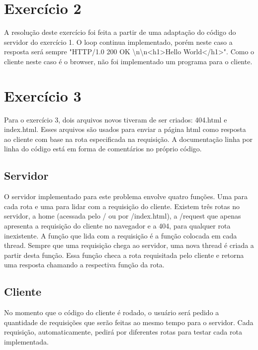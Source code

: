 \documentclass[a4paper,12pt]{article}
\begin{document}
\section{Exercício 2}
A resolução deste exercício foi feita a partir de uma adaptação do código do servidor do exercício 1. O loop continua implementado, porém neste caso a resposta será sempre "HTTP/1.0 200 OK \textbackslash n\textbackslash n<h1>Hello World</h1>". Como o cliente neste caso é o browser, não foi implementado um programa para o cliente.
\section{Exercício 3}
Para o exercício 3, dois arquivos novos tiveram de ser criados: 404.html e index.html. Esses arquivos são usados para enviar a página html como resposta ao cliente com base na rota especificada na requisição. A documentação linha por linha do código está em forma de comentários no próprio código.
\subsection{Servidor}
O servidor implementado para este problema envolve quatro funções. Uma para   cada rota e uma para lidar com a requisição do cliente. Existem três rotas no servidor, a home (acessada pelo / ou por /index.html), a /request que apenas apresenta a requisição do cliente no navegador e a 404, para qualquer rota inexistente. A função que lida com a requisição é a função colocada em cada thread. Sempre que uma requisição chega ao servidor, uma nova thread é criada a partir desta função. Essa função checa a rota requisitada pelo cliente e retorna uma resposta chamando a respectiva função da rota.
\subsection{Cliente}
No momento que o código do cliente é rodado, o usuário será pedido a quantidade de requisições que serão feitas ao mesmo tempo para o servidor. Cada requisição, automaticamente, pedirá por diferentes rotas para testar cada rota implementada.
\end{document}
